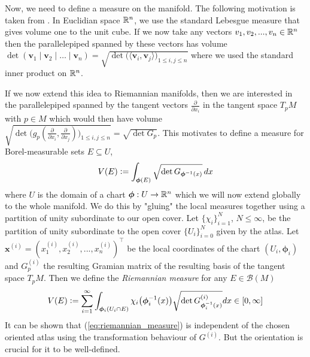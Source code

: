 \documentclass[../master_thesis.tex]{subfiles}
\begin{document}
Now, we need to define a measure on the manifold. 
The following motivation is taken from \cite[3.H.2]{gallot_hulin_lafontaine}.
In Euclidian space $\mathbb{R}^n$, we use the standard Lebesgue measure that gives 
volume one to the unit cube. If we now take any vectors $v_1, v_2, ..., v_n 
\in \mathbb{R}^n$ then the parallelepiped spanned by these vectors has 
volume $\det (\mathbf{v}_1 \mid \mathbf{v}_2 \mid \dots \mid \mathbf{v}_n) 
= \sqrt{ \det \big( \langle \mathbf{v}_i , \mathbf{v}_j \rangle \big)_{1\leq i,j \leq n} }$ where 
we used the standard inner product on $\mathbb{R}^n$. 

If we now extend this idea to Riemannian manifolds, then we are interested 
in the parallelepiped spanned by the tangent vectors $\frac{\partial}{\partial x_i}$
in the tangent space $T_p M$ with $p \in M$
which would then have volume $ \sqrt{\det \big( g_p(\frac{\partial}{\partial x_i}, 
\frac{\partial}{\partial x_j}) \big)_{1\leq i,j \leq n} } = 
\sqrt{ \det G_p }$. This motivates to define a measure for Borel-measurable sets 
$E \subseteq U$, 
\begin{align*}
    V(E) \vcentcolon= \int_{\boldsymbol{\phi}(E)} \sqrt{ \det G_{\boldsymbol{\phi}^{-1}(x)}} \,dx 
\end{align*} 
where $U$ is 
the domain of a chart $\boldsymbol{\phi}: U \rightarrow \mathbb{R}^n$ 
which we will now extend globally to the whole manifold. We do this 
by "gluing" the local measures together using a partition of unity subordinate 
to our open cover. 
Let $\{ \chi_i \}_{i=1}^N$, $N \leq \infty$, be the partition of unity 
subordinate to the open cover $\{U_i\}_{i = 0}^N$ given by the atlas. 
Let $\mathbf{x}^{(i)} = (x_1^{(i)}, x_2^{(i)}, ..., x_n^{(i)})^\top$ be the local 
coordinates of the chart $(U_i,\bm{\phi}_i)$ and 
$G_p^{(i)}$ the resulting Gramian matrix of the resulting basis of the tangent space
$T_p M$.
Then we define the 
\textit{Riemannian measure} for any $E \in \mathcal{B}(M)$
\begin{align}
    V(E) \vcentcolon= \sum\limits_{i=1}^\infty \int_{\boldsymbol{\phi}_i(U_i \cap E)}
        \chi_i\big(\boldsymbol{\phi}_i^{-1}(x)\big) \sqrt{\det G^{(i)}_{\boldsymbol{\phi}_i^{-1}(x)}} dx 
        \in [0,\infty] \label{eq:riemannian_measure}
\end{align}
It can be shown that (\ref{eq:riemannian_measure}) is independent of the chosen oriented atlas 
using the transformation behaviour of $G^{(i)}$. But the orientation is 
crucial for it to be well-defined. 
\end{document}
